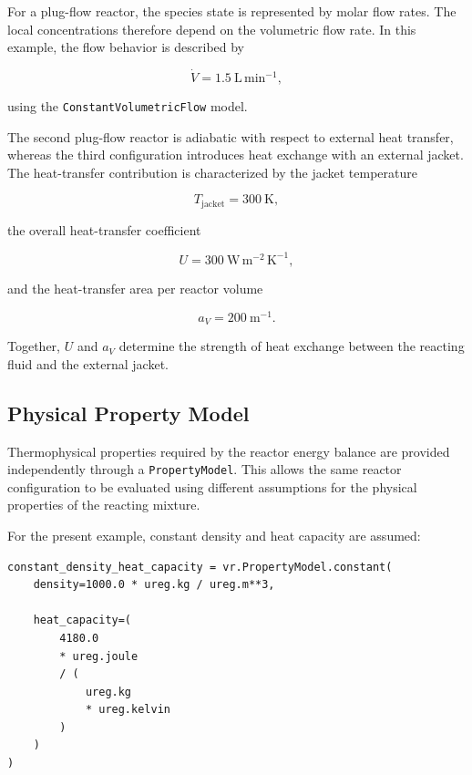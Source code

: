 For a plug-flow reactor, the species state is represented by molar flow rates.
The local concentrations therefore depend on the volumetric flow rate. In this
example, the flow behavior is described by

\begin{equation}
    \dot{V}
    =
    1.5~\mathrm{L\,min^{-1}},
\end{equation}

using the \texttt{ConstantVolumetricFlow} model.

The second plug-flow reactor is adiabatic with respect to external heat
transfer, whereas the third configuration introduces heat exchange with an
external jacket. The heat-transfer contribution is characterized by the jacket
temperature

\begin{equation}
    T_{\mathrm{jacket}} = 300~\mathrm{K},
\end{equation}

the overall heat-transfer coefficient

\begin{equation}
    U = 300~\mathrm{W\,m^{-2}\,K^{-1}},
\end{equation}

and the heat-transfer area per reactor volume

\begin{equation}
    a_V = 200~\mathrm{m^{-1}}.
\end{equation}

Together, $U$ and $a_V$ determine the strength of heat exchange between the
reacting fluid and the external jacket.


\subsection{Physical Property Model}

Thermophysical properties required by the reactor energy balance are provided
independently through a \texttt{PropertyModel}. This allows the same reactor
configuration to be evaluated using different assumptions for the physical
properties of the reacting mixture.

For the present example, constant density and heat capacity are assumed:

\begin{verbatim}
constant_density_heat_capacity = vr.PropertyModel.constant(
    density=1000.0 * ureg.kg / ureg.m**3,

    heat_capacity=(
        4180.0
        * ureg.joule
        / (
            ureg.kg
            * ureg.kelvin
        )
    )
)
\end{verbatim}

